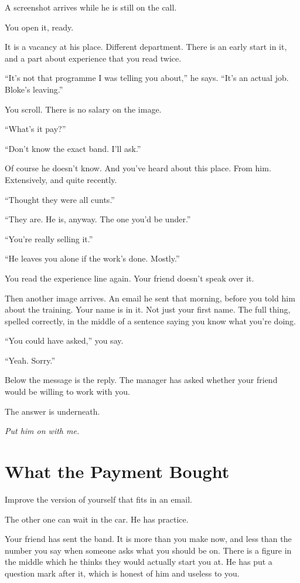 \documentclass[11pt,oneside]{book}
\begin{document}
A screenshot arrives while he is still on the call.

You open it, ready.

It is a vacancy at his place. Different department. There is an early start in it, and a part about experience that you read twice.

``It's not that programme I was telling you about,'' he says. ``It's an actual job. Bloke's leaving.''

You scroll. There is no salary on the image.

``What's it pay?''

``Don't know the exact band. I'll ask.''

Of course he doesn't know. And you've heard about this place. From him. Extensively, and quite recently.

``Thought they were all cunts.''

``They are. He is, anyway. The one you'd be under.''

``You're really selling it.''

``He leaves you alone if the work's done. Mostly.''

You read the experience line again. Your friend doesn't speak over it.

Then another image arrives. An email he sent that morning, before you told him about the training. Your name is in it. Not just your first name. The full thing, spelled correctly, in the middle of a sentence saying you know what you're doing.

``You could have asked,'' you say.

``Yeah. Sorry.''

Below the message is the reply. The manager has asked whether your friend would be willing to work with you.

The answer is underneath.

\emph{Put him on with me.}

\chapter*{What the Payment Bought}

Improve the version of yourself that fits in an email.

The other one can wait in the car. He has practice.

Your friend has sent the band. It is more than you make now, and less than the number you say when someone asks what you should be on. There is a figure in the middle which he thinks they would actually start you at. He has put a question mark after it, which is honest of him and useless to you.
\end{document}
